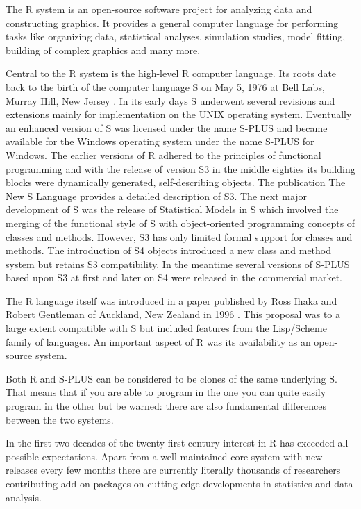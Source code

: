 \documentclass[
]{book}
\begin{document}
The R system is an open-source software project for analyzing data and constructing graphics. It provides a general computer language for performing tasks like organizing data, statistical analyses, simulation studies, model fitting, building of complex graphics and many more.

Central to the R system is the high-level R computer language. Its roots date back to the birth of the computer language S on May 5, 1976 at Bell Labs, Murray Hill, New Jersey \citep{Chambers2008}. In its early days S underwent several revisions and extensions mainly for implementation on the UNIX operating system. Eventually an enhanced version of S was licensed under the name S-PLUS and became available for the Windows operating system under the name S-PLUS for Windows. The earlier versions of R adhered to the principles of functional programming and with the release of version S3 in the middle eighties its building blocks were dynamically generated, self-describing objects. The publication The New S Language \citep{BeckerChambersWilks1988} provides a detailed description of S3. The next major development of S was the release of Statistical Models in S \citep{ChambersHastie1993} which involved the merging of the functional style of S with object-oriented programming concepts of classes and methods. However, S3 has only limited formal support for classes and methods. The introduction of S4 objects \citep{Chambers1998} introduced a new class and method system but retains S3 compatibility. In the meantime several versions of S-PLUS based upon S3 at first and later on S4 were released in the commercial market.

The R language itself was introduced in a paper published by Ross Ihaka and Robert Gentleman of Auckland, New Zealand in 1996 \citep{IhakaGentleman1996}. This proposal was to a large extent compatible with S but included features from the Lisp/Scheme family of languages. An important aspect of R was its availability as an open-source system.

Both R and S-PLUS can be considered to be clones of the same underlying S. That means that if you are able to program in the one you can quite easily program in the other but be warned: there are also fundamental differences between the two systems.

In the first two decades of the twenty-first century interest in R has exceeded all possible expectations. Apart from a well-maintained core system with new releases every few months there are currently literally thousands of researchers contributing add-on packages on cutting-edge developments in statistics and data analysis.
\end{document}
